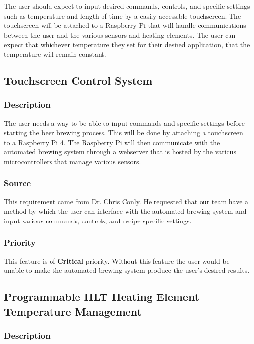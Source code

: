 The user should expect to input desired commands, controls, and specific
settings such as temperature and length of time by a easily accessible
touchscreen. The touchscreen will be attached to a Raspberry Pi that will handle
communications between the user and the various sensors and heating elements.
The user can expect that whichever temperature they set for their desired
application, that the temperature will remain constant.

\subsection{Touchscreen Control System}

\subsubsection{Description}
The user needs a way to be able to input commands and specific settings before
starting the beer brewing process. This will be done by attaching a touchscreen
to a Raspberry Pi 4. The Raspberry Pi will then communicate with the automated
brewing system through a webserver that is hosted by the various
microcontrollers that manage various sensors. 

\subsubsection{Source}
This requirement came from Dr. Chris Conly. He requested that our team have a
method by which the user can interface with the automated brewing system and
input various commands, controls, and recipe specific settings.
\subsubsection{Priority}
This feature is of \textbf{Critical} priority. Without this feature the user
would be unable to make the automated brewing system produce the user's desired results. 

\subsection{Programmable HLT Heating Element Temperature Management}
\subsubsection{Description}

